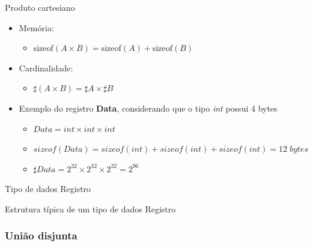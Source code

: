 \documentclass[handout]{beamer}
\begin{document}
\begin{frame}{Produto cartesiano}
		\begin{itemize}
			\item Memória:
				\begin{itemize}
					\item $\mathrm{sizeof}(A \times B) = \mathrm{sizeof}(A) + \mathrm{sizeof}(B)$
				\end{itemize}

			\item Cardinalidade:
				\begin{itemize}
					\item $\sharp(A \times B) = \sharp A  \times \sharp B$
				\end{itemize}

			\item Exemplo do registro \textbf{Data}, considerando que o tipo \textit{int} possui 4 bytes
				\begin{itemize}
					\item $Data = int \times int \times int$
					\item $sizeof(Data) = sizeof(int) + sizeof(int) + sizeof(int) = 12\; bytes$
					\item $\sharp Data = 2^{32} \times 2^{32} \times 2^{32} = 2^{96}$
				\end{itemize}
		\end{itemize}
 \end{frame}

\begin{frame}[fragile]{Tipo de dados Registro}

	\begin{block}{Estrutura típica de um tipo de dados Registro}
		\centering
    \end{block}

\end{frame}


\subsubsection{União disjunta}
\end{document}
